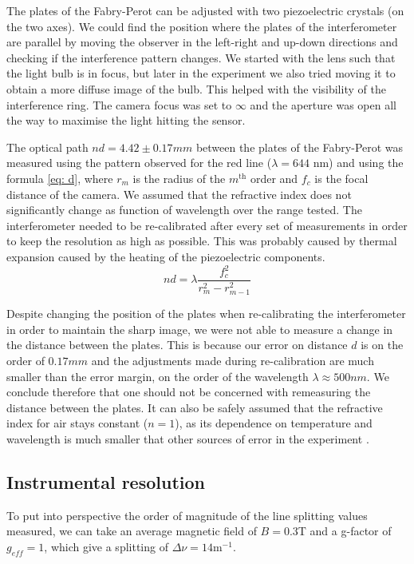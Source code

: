 \documentclass[11pt]{article}
\begin{document}
The plates of the Fabry-Perot can be adjusted with two piezoelectric crystals (on the two axes). We could find the position where the plates of the interferometer are parallel by moving the observer in the left-right and up-down directions and checking if the interference pattern changes. We started with the lens such that the light bulb is in focus, but later in the experiment we also tried moving it to obtain a more diffuse image of the bulb. This helped with the visibility of the interference ring. The camera focus was set to $\infty$ and the aperture was open all the way to maximise the light hitting the sensor. 
\label{sec: d}

The optical path $nd = 4.42 \pm 0.17 \si{mm}$ between the plates of the Fabry-Perot was measured using the pattern observed for the red line ($\lambda = 644$ nm) and using the formula \eqref{eq: d}, where $r_m$ is the radius of the $m^{\text{th}}$ order and $f_c$ is the focal distance of the camera. We assumed that the refractive index does not significantly change as function of wavelength over the range tested. The interferometer needed to be re-calibrated after every set of measurements in order to keep the resolution as high as possible. This was probably caused by thermal expansion caused by the heating of the piezoelectric components. 
\begin{equation}
    nd = \lambda \frac{f_c^2}{r_m^2-r_{m-1}^2} \label{eq: d}
\end{equation}

Despite changing the position of the plates when re-calibrating the interferometer in order to maintain the sharp image, we were not able to measure a change in the distance between the plates. This is because our error on distance $d$ is on the order of $0.17 \si{mm}$ and the adjustments made during re-calibration are much smaller than the error margin, on the order of the wavelength $\lambda \approx 500 \si{nm}$. We conclude therefore that one should not be concerned with remeasuring the distance between the plates. It can also be safely assumed that the refractive index for air stays constant ($n=1$), as its dependence on temperature and wavelength is much smaller that other sources of error in the experiment \cite{Polyanskiy2024}. 

\subsection{Instrumental resolution}
To put into perspective the order of magnitude of the line splitting values measured, we can take an average magnetic field of $B = 0.3$T and a g-factor of $g_{eff}=1$, which give a splitting of $\Delta \nu = 14 \mathrm{m}^{-1}$. 
 
\end{document}
